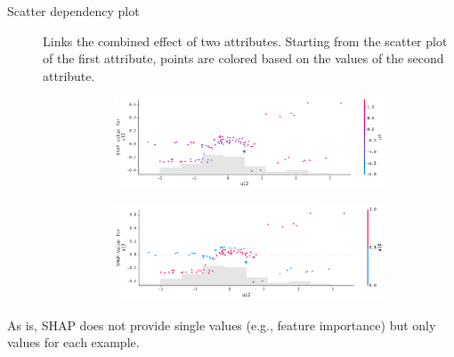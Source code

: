 \begin{description}
\begin{description}
\begin{description}
                        \item[Scatter dependency plot] 
                            Links the combined effect of two attributes. Starting from the scatter plot of the first attribute, points are colored based on the values of the second attribute.
                            \begin{figure}[H]
                                \raggedleft
                                \begin{subfigure}{0.8\linewidth}
                                    \raggedleft
                                    \includegraphics[width=\linewidth]{./img/_biomed_shap_dependecy1.pdf}
                                \end{subfigure}
                                \begin{subfigure}{0.8\linewidth}
                                    \raggedleft
                                    \includegraphics[width=\linewidth]{./img/_biomed_shap_dependency2.pdf}
                                \end{subfigure}
                            \end{figure}
                    \end{description}
        \end{description}

        \begin{remark}
            As is, SHAP does not provide single values (e.g., feature importance) but only values for each example.
        \end{remark}


\end{description}
